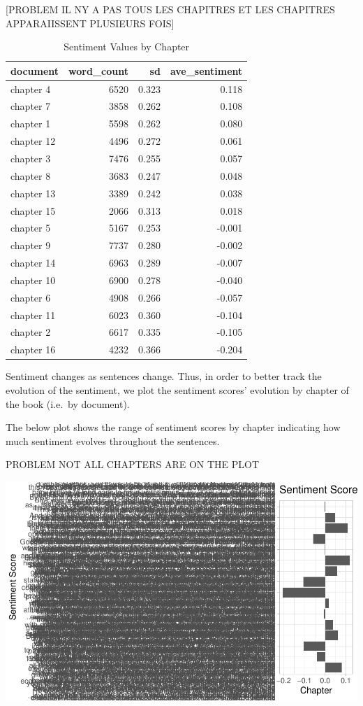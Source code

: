 \documentclass[
]{article}
\begin{document}
{[}PROBLEM IL NY A PAS TOUS LES CHAPITRES ET LES CHAPITRES APPARAIISSENT
PLUSIEURS FOIS{]}

\begin{table}

\caption{\label{tab:sentiment analysis by document}Sentiment Values by Chapter}
\centering
\begin{tabular}[t]{l|r|r|r}
\hline
document & word\_count & sd & ave\_sentiment\\
\hline
chapter 4 & 6520 & 0.323 & 0.118\\
\hline
chapter 7 & 3858 & 0.262 & 0.108\\
\hline
chapter 1 & 5598 & 0.262 & 0.080\\
\hline
chapter 12 & 4496 & 0.272 & 0.061\\
\hline
chapter 3 & 7476 & 0.255 & 0.057\\
\hline
chapter 8 & 3683 & 0.247 & 0.048\\
\hline
chapter 13 & 3389 & 0.242 & 0.038\\
\hline
chapter 15 & 2066 & 0.313 & 0.018\\
\hline
chapter 5 & 5167 & 0.253 & -0.001\\
\hline
chapter 9 & 7737 & 0.280 & -0.002\\
\hline
chapter 14 & 6963 & 0.289 & -0.007\\
\hline
chapter 10 & 6900 & 0.278 & -0.040\\
\hline
chapter 6 & 4908 & 0.266 & -0.057\\
\hline
chapter 11 & 6023 & 0.360 & -0.104\\
\hline
chapter 2 & 6617 & 0.335 & -0.105\\
\hline
chapter 16 & 4232 & 0.366 & -0.204\\
\hline
\end{tabular}
\end{table}

Sentiment changes as sentences change. Thus, in order to better track
the evolution of the sentiment, we plot the sentiment scores' evolution
by chapter of the book (i.e.~by document).

The below plot shows the range of sentiment scores by chapter indicating
how much sentiment evolves throughout the sentences.

PROBLEM NOT ALL CHAPTERS ARE ON THE PLOT

\begin{center}\includegraphics[width=0.7\linewidth]{report_files/figure-latex/sentiment analysis by document plot-1} \end{center}
\end{document}
